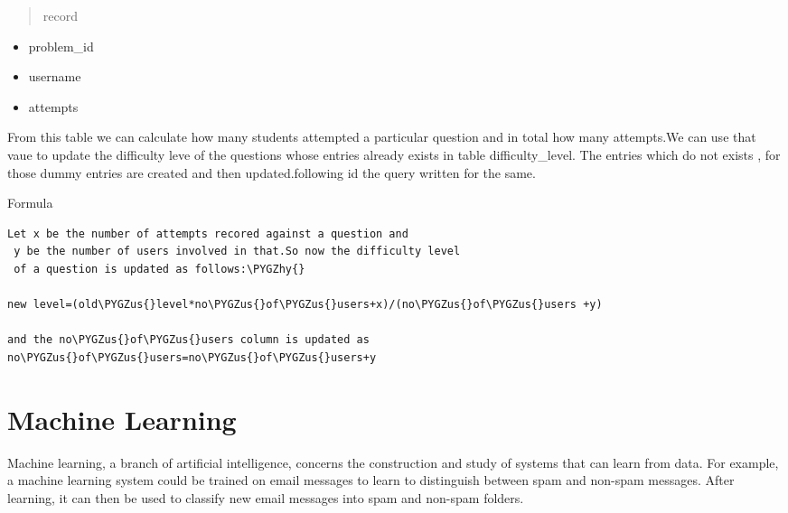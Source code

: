 \documentclass[a4paper,12pt,oneside]{sphinxmanual}
\def\PYGZus{\char`\_}
\def\PYGZhy{\char`\-}
\begin{document}
\begin{quote}\begin{description}
\item[{record}] \leavevmode
\end{description}\end{quote}
\begin{itemize}
\item {} 
problem\_id

\item {} 
username

\item {} 
attempts

\end{itemize}

\begin{DUlineblock}{0em}
\item[] From this table we can calculate how many students attempted a particular question and in total how many attempts.We can use that vaue to update the difficulty leve of the questions whose entries already exists in table difficulty\_level. The entries which do not exists , for those dummy entries are created and then updated.following id the query written for the same.
\end{DUlineblock}

Formula

\begin{Verbatim}[commandchars=\\\{\}]
Let x be the number of attempts recored against a question and
 y be the number of users involved in that.So now the difficulty level
 of a question is updated as follows:\PYGZhy{}

new level=(old\PYGZus{}level*no\PYGZus{}of\PYGZus{}users+x)/(no\PYGZus{}of\PYGZus{}users +y)

and the no\PYGZus{}of\PYGZus{}users column is updated as
no\PYGZus{}of\PYGZus{}users=no\PYGZus{}of\PYGZus{}users+y
\end{Verbatim}


\chapter{Machine Learning}
\label{document:machine-learning}
Machine learning, a branch of artificial intelligence, concerns the construction and study of systems that can learn from data. For example, a machine learning system could be trained on email messages to learn to distinguish between spam and non-spam messages. After learning, it can then be used to classify new email messages into spam and non-spam folders.
\end{document}
